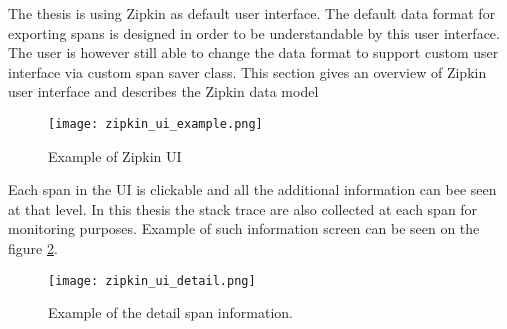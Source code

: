 The thesis is using Zipkin as default user interface. The default data format for exporting spans is designed in order to be understandable by this user interface. The user is however still able to change the data format to support custom user interface via custom span saver class. This section gives an overview of Zipkin user interface and describes the Zipkin data model


\begin{figure}
	\centering
	\texttt{[image: zipkin\_ui\_example.png]}
	\caption{Example of Zipkin UI}
	\label{fig:zipkin_ui}
\end{figure}

Each span in the UI is clickable and all the additional information can bee seen at that level. In this thesis the stack trace are also collected at each span for monitoring purposes. Example of such information screen can be seen on the figure \ref{fig:zipkin_ui_detail}.
\begin{figure}
	\centering
	\texttt{[image: zipkin\_ui\_detail.png]}
	\caption{Example of the detail span information.}
	\label{fig:zipkin_ui_detail}
\end{figure}
